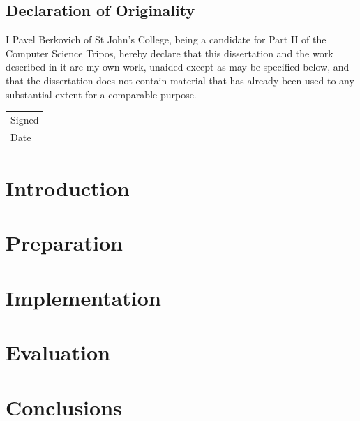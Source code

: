 \documentclass[a4paper, 12pt]{report}
\newcommand{\skippage}{\newpage\null\newpage}
\begin{document}
\pagebreak
\section*{Declaration of Originality}
I Pavel Berkovich of St John's College, being a candidate for Part II of the Computer Science Tripos, hereby declare that this dissertation and the work described in it are my own work, unaided except as may be specified below, and that the dissertation does not contain material that has already been used to any substantial extent for a comparable purpose. \\[0.8cm]
\begin{tabular}{l}
    Signed \\[0.8cm]
    Date
\end{tabular}
\vfill

\tableofcontents

\skippage



\chapter{Introduction}


\chapter{Preparation}


\chapter{Implementation}


\chapter{Evaluation}


\chapter{Conclusions}



\begin{thebibliography}{9}

\end{thebibliography}
\end{document}
